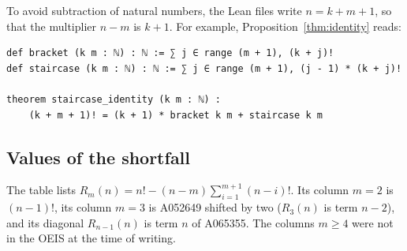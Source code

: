 \documentclass[11pt]{amsart}
\theoremstyle{plain}
\theoremstyle{definition}
\theoremstyle{remark}
\begin{document}
To avoid subtraction of natural numbers, the Lean files write $n=k+m+1$, so
that the multiplier $n-m$ is $k+1$. For example,
Proposition~\ref{thm:identity} reads:
\begin{lstlisting}
def bracket (k m : ℕ) : ℕ := ∑ j ∈ range (m + 1), (k + j)!
def staircase (k m : ℕ) : ℕ := ∑ j ∈ range (m + 1), (j - 1) * (k + j)!

theorem staircase_identity (k m : ℕ) :
    (k + m + 1)! = (k + 1) * bracket k m + staircase k m
\end{lstlisting}

\subsection{Values of the shortfall}
The table lists $R_m(n)=n!-(n-m)\sum_{i=1}^{m+1}(n-i)!$. Its column $m=2$ is
$(n-1)!$, its column $m=3$ is A052649 shifted by two ($R_3(n)$ is term $n-2$),
and its diagonal $R_{n-1}(n)$ is term $n$ of A065355. The columns $m\ge4$ were
not in the OEIS at the time of writing.

\begin{center}

\end{center}



\end{document}
